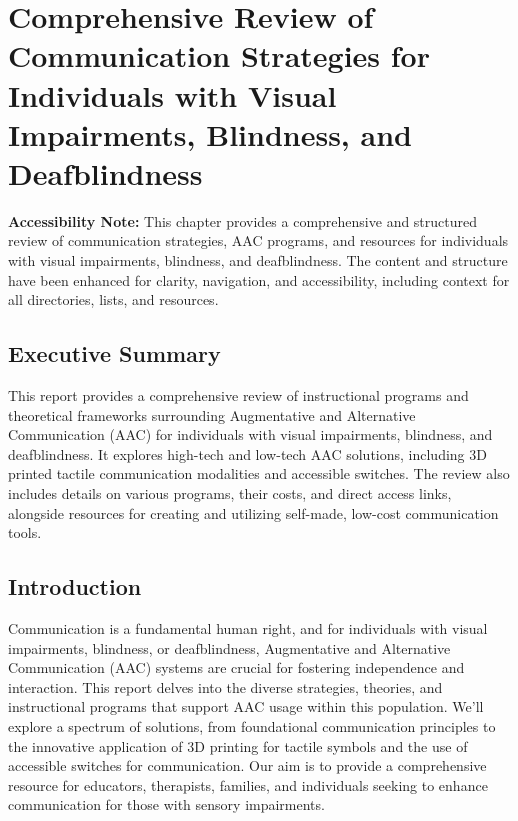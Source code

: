\chapter{Comprehensive Review of Communication Strategies for Individuals with Visual Impairments, Blindness, and Deafblindness}\label{chap:comm-strategies}

\textbf{Accessibility Note:} This chapter provides a comprehensive and structured review of communication strategies, AAC programs, and resources for individuals with visual impairments, blindness, and deafblindness. The content and structure have been enhanced for clarity, navigation, and accessibility, including context for all directories, lists, and resources.


\section{Executive Summary}\label{sec:exec-summary}

This report provides a comprehensive review of instructional programs and theoretical frameworks surrounding Augmentative and Alternative Communication (AAC) for individuals with visual impairments, blindness, and deafblindness. It explores high-tech and low-tech AAC solutions, including 3D printed tactile communication modalities and accessible switches. The review also includes details on various programs, their costs, and direct access links, alongside resources for creating and utilizing self-made, low-cost communication tools.

\section{Introduction}\label{sec:intro}

Communication is a fundamental human right, and for individuals with visual impairments, blindness, or deafblindness, Augmentative and Alternative Communication (AAC) systems are crucial for fostering independence and interaction. This report delves into the diverse strategies, theories, and instructional programs that support AAC usage within this population. We'll explore a spectrum of solutions, from foundational communication principles to the innovative application of 3D printing for tactile symbols and the use of accessible switches for communication. Our aim is to provide a comprehensive resource for educators, therapists, families, and individuals seeking to enhance communication for those with sensory impairments.

